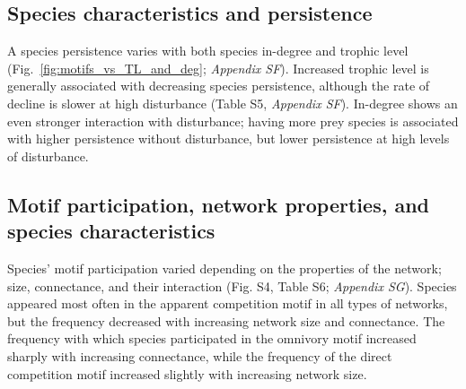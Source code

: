 \documentclass[12pt]{article}
\begin{document}
\begin{spacing}{2.0}
    \subsection*{Species characteristics and persistence}
    
        A species persistence varies with both species in-degree and trophic level (Fig.~\ref{fig:motifs_vs_TL_and_deg}; \emph{Appendix SF}). Increased trophic level is generally associated with decreasing species persistence, although the rate of decline is slower at high disturbance (Table S5, \emph{Appendix SF}).
        In-degree shows an even stronger interaction with disturbance; having more prey species is associated with higher persistence without disturbance, but lower persistence at high levels of disturbance.

    
    \clearpage
    
    \subsection*{Motif participation, network properties, and species characteristics}

       Species' motif participation varied depending on the properties of the network; size, connectance, and their interaction (Fig. S4, Table S6; \emph{Appendix SG}).
        Species appeared most often in the apparent competition motif in all types of networks, but the frequency decreased with increasing network size and connectance.
        The frequency with which species participated in the omnivory motif increased sharply with increasing connectance, while the frequency of the direct competition motif increased slightly with increasing network size. 
        

\end{spacing}
\end{document}
